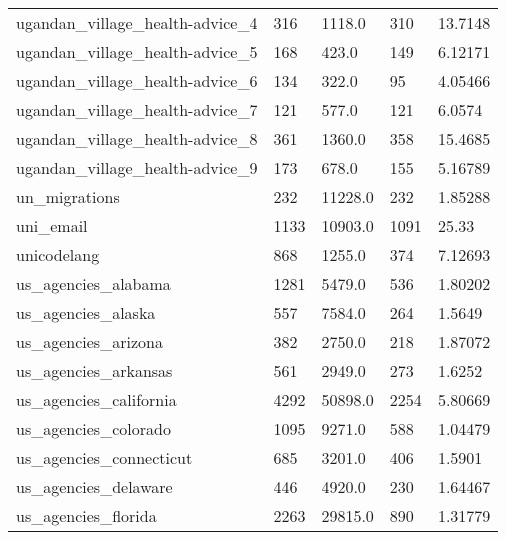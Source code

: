 \begin{longtable}{lllll}
 ugandan\_village\_health-advice\_4                    & 316        & 1118.0      & 310   & 13.7148    \\
 ugandan\_village\_health-advice\_5                    & 168        & 423.0       & 149   & 6.12171    \\
 ugandan\_village\_health-advice\_6                    & 134        & 322.0       & 95    & 4.05466    \\
 ugandan\_village\_health-advice\_7                    & 121        & 577.0       & 121   & 6.0574     \\
 ugandan\_village\_health-advice\_8                    & 361        & 1360.0      & 358   & 15.4685    \\
 ugandan\_village\_health-advice\_9                    & 173        & 678.0       & 155   & 5.16789    \\
 un\_migrations                                      & 232        & 11228.0     & 232   & 1.85288    \\
 uni\_email                                          & 1133       & 10903.0     & 1091  & 25.33      \\
 unicodelang                                        & 868        & 1255.0      & 374   & 7.12693    \\
 us\_agencies\_alabama                                & 1281       & 5479.0      & 536   & 1.80202    \\
 us\_agencies\_alaska                                 & 557        & 7584.0      & 264   & 1.5649     \\
 us\_agencies\_arizona                                & 382        & 2750.0      & 218   & 1.87072    \\
 us\_agencies\_arkansas                               & 561        & 2949.0      & 273   & 1.6252     \\
 us\_agencies\_california                             & 4292       & 50898.0     & 2254  & 5.80669    \\
 us\_agencies\_colorado                               & 1095       & 9271.0      & 588   & 1.04479    \\
 us\_agencies\_connecticut                            & 685        & 3201.0      & 406   & 1.5901     \\
 us\_agencies\_delaware                               & 446        & 4920.0      & 230   & 1.64467    \\
 us\_agencies\_florida                                & 2263       & 29815.0     & 890   & 1.31779    \\

\end{longtable}
